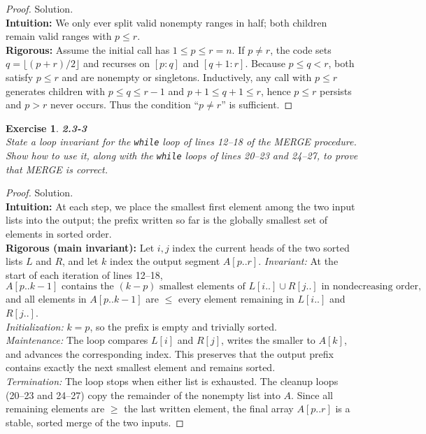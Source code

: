 \documentclass[12pt]{article}
\newtheorem{exercise}[theorem]{Exercise}
\theoremstyle{definition}
\begin{document}
\vspace{1pt}

\begin{proof}
Solution.\\

\noindent
\textbf{Intuition:} We only ever split valid nonempty ranges in half; both
children remain valid ranges with $p\le r$.\\

\noindent
\textbf{Rigorous:} Assume the initial call has $1\le p\le r=n$. If $p\ne r$, the code
sets $q=\lfloor(p+r)/2\rfloor$ and recurses on $[p:q]$ and $[q+1:r]$.
Because $p\le q<r$, both satisfy $p\le r$ and are nonempty or singletons.
Inductively, any call with $p\le r$ generates children with
$p\le q\le r-1$ and $p+1\le q+1\le r$, hence $p\le r$ persists and
$p>r$ never occurs. Thus the condition “$p\ne r$” is sufficient.
\end{proof}

\newpage

\begin{exercise}
\noindent
\textbf{2.3-3}\\
\noindent
State a loop invariant for the \texttt{while} loop of lines 12–18 of the \textsc{MERGE}
procedure. Show how to use it, along with the \texttt{while} loops of lines 20–23
and 24–27, to prove that \textsc{MERGE} is correct.
\end{exercise}

\vspace{1pt}

\begin{proof}
Solution.\\

\noindent
\textbf{Intuition:} At each step, we place the smallest first element among the
two input lists into the output; the prefix written so far is the globally
smallest set of elements in sorted order.\\

\noindent
\textbf{Rigorous (main invariant):}
Let $i,j$ index the current heads of the two sorted lists $L$ and $R$, and let
$k$ index the output segment $A[p..r]$. \emph{Invariant:} At the start of each
iteration of lines 12–18,
\[
A[p..k-1] \text{ contains the }(k-p)\text{ smallest elements of }L[i..]\cup R[j..]
\text{ in nondecreasing order,}
\]
and all elements in $A[p..k-1]$ are $\le$ every element remaining in
$L[i..]$ and $R[j..]$.\\
\emph{Initialization:} $k=p$, so the prefix is empty and trivially sorted.\\
\emph{Maintenance:} The loop compares $L[i]$ and $R[j]$, writes the smaller
to $A[k]$, and advances the corresponding index. This preserves that the
output prefix contains exactly the next smallest element and remains sorted.\\
\emph{Termination:} The loop stops when either list is exhausted. The
cleanup loops (20–23 and 24–27) copy the remainder of the nonempty list
into $A$. Since all remaining elements are $\ge$ the last written element,
the final array $A[p..r]$ is a stable, sorted merge of the two inputs.
\end{proof}
\end{document}
